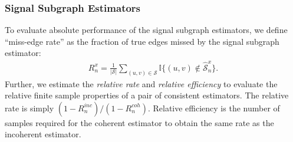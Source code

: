\documentclass[10pt,journal,cspaper,compsoc]{IEEEtran}
\newcommand{\GG}{\mathbb{G}}
\newcommand{\EE}{\mathbb{E}}           %
\newcommand{\II}{\mathbb{I}}           %
\providecommand{\mc}[1]{\mathcal{#1}}
\providecommand{\mhc}[1]{\hat{\mathcal{#1}}}
\begin{document}
\subsubsection{Signal Subgraph Estimators} %
\label{ssub:signal_subgraph_estimators}


To evaluate absolute performance of the signal subgraph estimators, we define  ``miss-edge rate'' as the fraction of true edges missed by the signal subgraph estimator:
\begin{align}
R^x_n = \frac{1}{|\mc{S}|} \sum_{(u,v)\in \mc{S}}\II\{(u,v) \notin \mhc{S}^x_n\}.
\end{align}
Further, we estimate the \emph{relative rate} and \emph{relative efficiency} to evaluate the relative finite sample properties of a pair of consistent estimators. The relative rate is simply $(1-R^{inc}_n)/(1-R^{coh}_n)$.  Relative efficiency is the number of samples required for the coherent estimator to obtain the same rate as the incoherent estimator.


% 




% 
% 
% 
% 
% 
\end{document}
